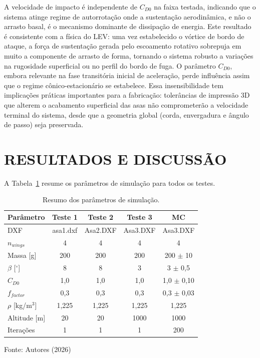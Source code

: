\documentclass[12pt,fleqn]{article}
\begin{document}
A velocidade de impacto é independente de $C_{D0}$ na faixa testada, indicando que o sistema atinge regime de autorrotação onde a sustentação aerodinâmica, e não o arrasto basal, é o mecanismo dominante de dissipação de energia. Este resultado é consistente com a física do LEV: uma vez estabelecido o vórtice de bordo de ataque, a força de sustentação gerada pelo escoamento rotativo sobrepuja em muito a componente de arrasto de forma, tornando o sistema robusto a variações na rugosidade superficial ou no perfil do bordo de fuga. O parâmetro $C_{D0}$, embora relevante na fase transitória inicial de aceleração, perde influência assim que o regime cônico-estacionário se estabelece. Essa insensibilidade tem implicações práticas importantes para a fabricação: tolerâncias de impressão 3D que alterem o acabamento superficial das asas não comprometerão a velocidade terminal do sistema, desde que a geometria global (corda, envergadura e ângulo de passo) seja preservada.


\section{RESULTADOS E DISCUSSÃO}

A Tabela~\ref{tab:resumo} resume os parâmetros de simulação para todos os testes.

\begin{table}[htbp]
\caption{Resumo dos parâmetros de simulação.}
\centering
\begin{tabular*}{\textwidth}{@{\extracolsep{\fill}}lcccc}
\hline
Parâmetro & Teste 1 & Teste 2 & Teste 3 & MC \\
\hline
DXF & asa1.dxf & Asa2.DXF & Asa3.DXF & Asa3.DXF \\
$n_{wings}$ & 4 & 4 & 4 & 4 \\
Massa [g] & 200 & 200 & 200 & 200 $\pm$ 10 \\
$\beta$ [$^\circ$] & 8 & 8 & 3 & 3 $\pm$ 0,5 \\
$C_{D0}$ & 1,0 & 1,0 & 1,0 & 1,0 $\pm$ 0,10 \\
$f_{factor}$ & 0,3 & 0,3 & 0,3 & 0,3 $\pm$ 0,03 \\
$\rho$ [kg/m$^3$] & 1,225 & 1,225 & 1,225 & 1,225 \\
Altitude [m] & 20 & 20 & 1000 & 1000 \\
Iterações & 1 & 1 & 1 & 200 \\
\hline
\end{tabular*}
{\footnotesize\centering Fonte: Autores (2026)\par}
\label{tab:resumo}
\end{table}
\end{document}
